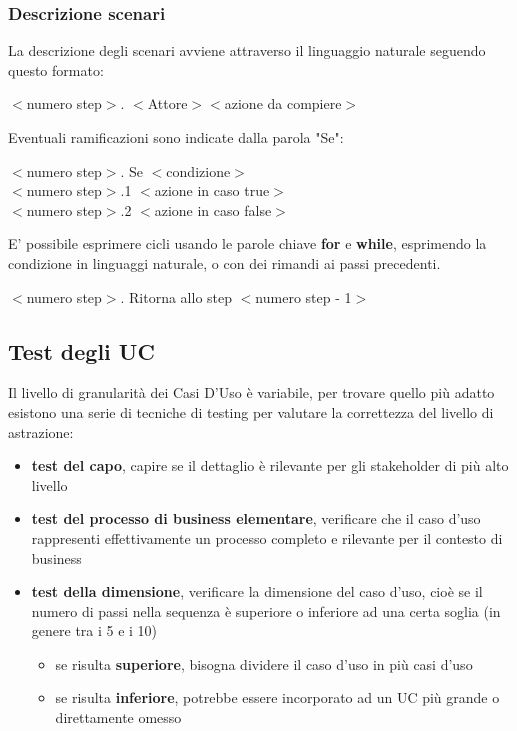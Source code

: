 \subsubsection{Descrizione scenari}
\label{subsection:scenari}
La descrizione degli scenari avviene attraverso il linguaggio naturale seguendo questo formato: 
\begin{center}
    $<$numero step$>$. $<$Attore$>$$<$azione da compiere$>$
\end{center}
Eventuali ramificazioni sono indicate dalla parola "Se":
\begin{center}
    $<$numero step$>$. Se $<$condizione$>$ \\
        $<$numero step$>$.1 $<$azione in caso true$>$ \\
        $<$numero step$>$.2 $<$azione in caso false$>$
\end{center}
E' possibile esprimere cicli usando le parole chiave \textbf{for} e \textbf{while}, esprimendo la condizione in linguaggi naturale, o con dei rimandi ai passi precedenti.
\begin{center}
        $<$numero step$>$. Ritorna allo step $<$numero step - 1$>$
\end{center}
\subsection{Test degli UC}
Il livello di granularità dei Casi D'Uso è variabile, per trovare quello più adatto esistono una serie di tecniche di testing per valutare la correttezza del livello di astrazione:
\begin{itemize}
    \item \textbf{test del capo}, capire se il dettaglio è rilevante per gli stakeholder di più alto livello
    \item \textbf{test del processo di business elementare}, verificare che il caso d'uso rappresenti effettivamente un processo completo e rilevante per il contesto di business
    \item \textbf{test della dimensione}, verificare la dimensione del caso d'uso, cioè se il numero di passi nella sequenza è superiore o inferiore ad una certa soglia (in genere tra i 5 e i 10)
    \begin{itemize}
        \item se risulta \textbf{superiore}, bisogna dividere il caso d'uso in più casi d'uso
        \item se risulta \textbf{inferiore}, potrebbe essere incorporato ad un UC più grande o direttamente omesso
    \end{itemize}
\end{itemize}